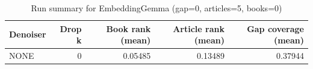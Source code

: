 \begin{table}
\caption{Run summary for EmbeddingGemma (gap=0, articles=5, books=0)}
\label{tab:summary_gap0_embeddinggemma_a5_b0}
\begin{tabular}{lrrrr}
\toprule
Denoiser & Drop k & Book rank (mean) & Article rank (mean) & Gap coverage (mean) \\
\midrule
NONE & 0 & 0.05485 & 0.13489 & 0.37944 \\
\bottomrule
\end{tabular}
\end{table}
